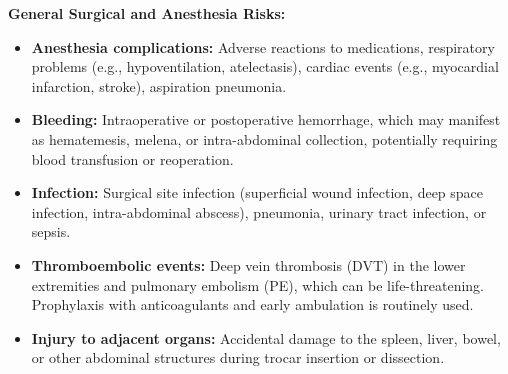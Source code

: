 \textbf{General Surgical and Anesthesia Risks:}
\begin{itemize}
  \item \textbf{Anesthesia complications:} Adverse reactions to medications, respiratory problems (e.g., hypoventilation, atelectasis), cardiac events (e.g., myocardial infarction, stroke), aspiration pneumonia.
  \item \textbf{Bleeding:} Intraoperative or postoperative hemorrhage, which may manifest as hematemesis, melena, or intra-abdominal collection, potentially requiring blood transfusion or reoperation.
  \item \textbf{Infection:} Surgical site infection (superficial wound infection, deep space infection, intra-abdominal abscess), pneumonia, urinary tract infection, or sepsis.
  \item \textbf{Thromboembolic events:} Deep vein thrombosis (DVT) in the lower extremities and pulmonary embolism (PE), which can be life-threatening. Prophylaxis with anticoagulants and early ambulation is routinely used.
  \item \textbf{Injury to adjacent organs:} Accidental damage to the spleen, liver, bowel, or other abdominal structures during trocar insertion or dissection.
\end{itemize}

